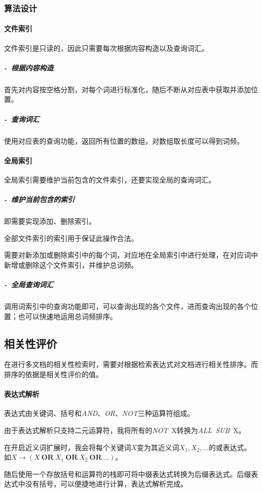 \documentclass[scheme = chinese]{ctexart}
\begin{document}
\subsubsection{算法设计}

\paragraph{文件索引} 文件索引是只读的，因此只需要每次根据内容构造以及查询词汇。

\subparagraph{-~根据内容构造}首先对内容按空格分割，对每个词进行标准化，随后不断从对应表中获取并添加位置。

\subparagraph{-~查询词汇}使用对应表的查询功能，返回所有位置的数组，对数组取长度可以得到词频。

\paragraph{全局索引} 全局索引需要维护当前包含的文件索引，还要实现全局的查询词汇。

\subparagraph{-~维护当前包含的索引} 即需要实现添加、删除索引。

全部文件索引的索引用于保证此操作合法。

需要对新添加或删除索引中的每个词，对应地在全局索引中进行处理，在对应词中新增或删除这个文件索引，并维护总词频。

\subparagraph{-~全局查询词汇} 调用词索引中的查询功能即可，可以查询出现的各个文件，进而查询出现的各个位置；也可以快速地运用总词频排序。

\clearpage

\subsection{相关性评价}
在进行多文档的相关性检索时，需要对根据检索表达式对文档进行相关性排序。而排序的依据是相关性评价的值。

\paragraph{表达式解析} 
表达式由关键词、括号和\emph{AND}、\emph{OR}、\emph{NOT}三种运算符组成。

由于表达式解析只支持二元运算符，我将所有的\emph{NOT}~X转换为\emph{ALL}~\emph{SUB}~X。

在开启近义词扩展时，我会将每个关键词$X$变为其近义词$X_1, X_2, \dots$的或表达式。如$X \rightarrow (X~\textbf{OR}~X_1~\textbf{OR}~X_2~\textbf{OR}~\dots)$。

随后使用一个存放括号和运算符的栈即可将中缀表达式转换为后缀表达式。后缀表达式中没有括号，可以便捷地进行计算，表达式解析完成。
\end{document}
